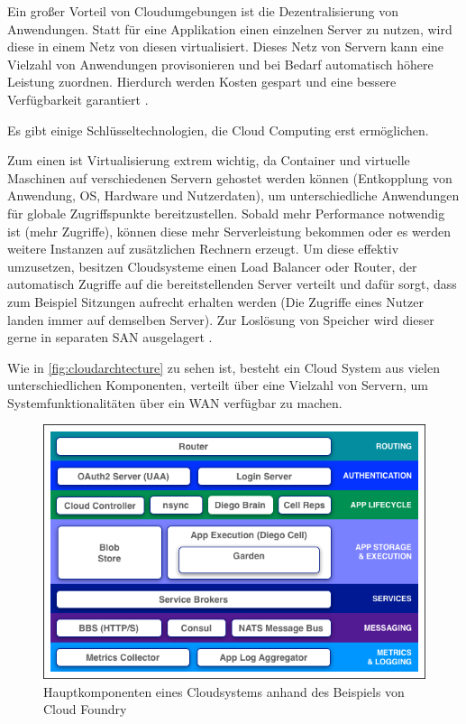 Ein großer Vorteil von Cloudumgebungen ist die Dezentralisierung von Anwendungen. Statt für eine Applikation einen einzelnen Server zu nutzen, wird diese in einem Netz von diesen virtualisiert. Dieses Netz von Servern kann eine Vielzahl von Anwendungen provisonieren und bei Bedarf automatisch höhere Leistung zuordnen. Hierdurch werden Kosten gespart und eine bessere Verfügbarkeit garantiert \parencite[S. 7]{furth.2010}.

Es gibt einige Schlüsseltechnologien, die Cloud Computing erst ermöglichen. 

Zum einen ist Virtualisierung extrem wichtig, da Container und virtuelle Maschinen auf verschiedenen Servern gehostet werden können (Entkopplung von Anwendung, OS, Hardware und Nutzerdaten), um unterschiedliche Anwendungen für globale Zugriffspunkte bereitzustellen. 
Sobald mehr Performance notwendig ist (mehr Zugriffe), können diese mehr Serverleistung bekommen oder es werden weitere Instanzen auf zusätzlichen Rechnern erzeugt.
Um diese effektiv umzusetzen, besitzen Cloudsysteme einen Load Balancer oder Router, der automatisch Zugriffe auf die bereitstellenden Server verteilt und dafür sorgt, dass zum Beispiel Sitzungen aufrecht erhalten werden (Die Zugriffe eines Nutzer landen immer auf demselben Server).
Zur Loslösung von Speicher wird dieser gerne in separaten \acs{SAN} ausgelagert \parencite[S. 22]{rafaels.2015}.

Wie in \autoref{fig:cloudarchtecture} zu sehen ist, besteht ein Cloud System aus vielen unterschiedlichen Komponenten, verteilt über eine Vielzahl von Servern, um Systemfunktionalitäten über ein \ac{WAN} verfügbar zu machen.   

\begin{figure}[hbt]
	\centering
	\includegraphics[scale=0.75]{images/cloud-architecture}
	\caption{Hauptkomponenten eines Cloudsystems anhand des Beispiels von Cloud Foundry  \parencite{cloudfoundry.2017}}
	\label{fig:cloudarchtecture}
\end{figure}


